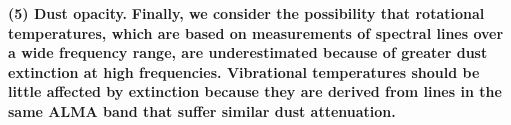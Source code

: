 \documentclass[twocolumn]{aastex62}
\newcommand{\referee}[1]{\textbf{#1}}
\begin{document}
\par{\textbf{(5) Dust opacity.}}
\referee{
Finally, we consider the possibility that rotational temperatures,
which are based on measurements of spectral lines over a wide frequency
range, are underestimated because of greater dust extinction at high
frequencies.  Vibrational temperatures should be little affected by
extinction because they are derived from lines in the same ALMA band that
suffer similar dust attenuation.}

\end{document}
